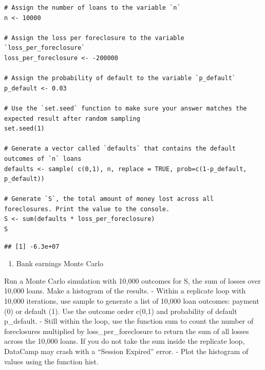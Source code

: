 \documentclass[
]{article}
\providecommand{\tightlist}{%
  \setlength{\itemsep}{0pt}\setlength{\parskip}{0pt}}
\begin{document}
\begin{verbatim}
# Assign the number of loans to the variable `n`
n <- 10000

# Assign the loss per foreclosure to the variable `loss_per_foreclosure`
loss_per_foreclosure <- -200000

# Assign the probability of default to the variable `p_default`
p_default <- 0.03

# Use the `set.seed` function to make sure your answer matches the expected result after random sampling
set.seed(1)

# Generate a vector called `defaults` that contains the default outcomes of `n` loans
defaults <- sample( c(0,1), n, replace = TRUE, prob=c(1-p_default, p_default))

# Generate `S`, the total amount of money lost across all foreclosures. Print the value to the console.
S <- sum(defaults * loss_per_foreclosure)
S
\end{verbatim}

\begin{verbatim}
## [1] -6.3e+07
\end{verbatim}

\begin{enumerate}
\def\labelenumi{\arabic{enumi}.}
\setcounter{enumi}{1}
\tightlist
\item
  Bank earnings Monte Carlo
\end{enumerate}

Run a Monte Carlo simulation with 10,000 outcomes for S, the sum of
losses over 10,000 loans. Make a histogram of the results. - Within a
replicate loop with 10,000 iterations, use sample to generate a list of
10,000 loan outcomes: payment (0) or default (1). Use the outcome order
c(0,1) and probability of default p\_default. - Still within the loop,
use the function sum to count the number of foreclosures multiplied by
loss\_per\_foreclosure to return the sum of all losses across the 10,000
loans. If you do not take the sum inside the replicate loop, DataCamp
may crash with a ``Session Expired'' error. - Plot the histogram of
values using the function hist.
\end{document}
